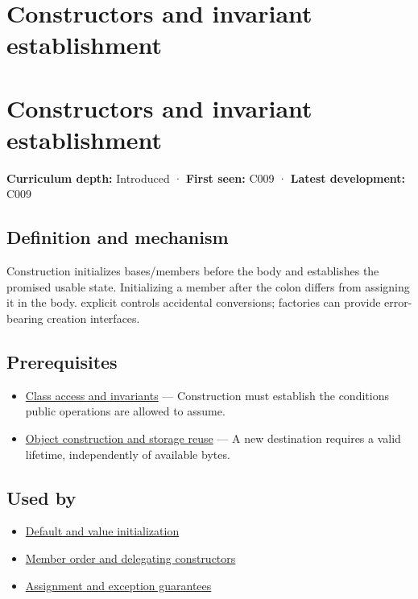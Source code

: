 \hypertarget{appendix-7f8ec83d0886}{}
\section*{Constructors and invariant establishment}
\section{Constructors and invariant establishment}\label{appendix-7f8ec83d0886-constructors-and-invariant-establishment}

\textbf{Curriculum depth:} Introduced · \textbf{First seen:} C009 · \textbf{Latest development:} C009

\subsection{Definition and mechanism}\label{appendix-7f8ec83d0886-definition-and-mechanism}

Construction initializes bases/members before the body and establishes the promised usable state. Initializing a member after the colon differs from assigning it in the body. explicit controls accidental conversions; factories can provide error-bearing creation interfaces.

\subsection{Prerequisites}\label{appendix-7f8ec83d0886-prerequisites}

\begin{itemize}
\tightlist
\item
  \hyperref[appendix-8e5214819615]{Class access and invariants} --- Construction must establish the conditions public operations are allowed to assume.
\item
  \hyperref[appendix-a82f9c438857]{Object construction and storage reuse} --- A new destination requires a valid lifetime, independently of available bytes.
\end{itemize}

\subsection{Used by}\label{appendix-7f8ec83d0886-used-by}

\begin{itemize}
\tightlist
\item
  \hyperref[appendix-ba8c1a9fe03f]{Default and value initialization}
\item
  \hyperref[appendix-3cb49709605a]{Member order and delegating constructors}
\item
  \hyperref[appendix-bea6beb5350f]{Assignment and exception guarantees}
\end{itemize}

